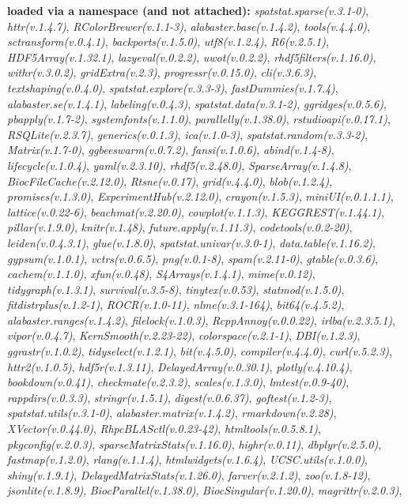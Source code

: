 \documentclass[
]{book}
\begin{document}
\textbf{loaded via a namespace (and not attached):}
\emph{spatstat.sparse(v.3.1-0)}, \emph{httr(v.1.4.7)}, \emph{RColorBrewer(v.1.1-3)}, \emph{alabaster.base(v.1.4.2)}, \emph{tools(v.4.4.0)}, \emph{sctransform(v.0.4.1)}, \emph{backports(v.1.5.0)}, \emph{utf8(v.1.2.4)}, \emph{R6(v.2.5.1)}, \emph{HDF5Array(v.1.32.1)}, \emph{lazyeval(v.0.2.2)}, \emph{uwot(v.0.2.2)}, \emph{rhdf5filters(v.1.16.0)}, \emph{withr(v.3.0.2)}, \emph{gridExtra(v.2.3)}, \emph{progressr(v.0.15.0)}, \emph{cli(v.3.6.3)}, \emph{textshaping(v.0.4.0)}, \emph{spatstat.explore(v.3.3-3)}, \emph{fastDummies(v.1.7.4)}, \emph{alabaster.se(v.1.4.1)}, \emph{labeling(v.0.4.3)}, \emph{spatstat.data(v.3.1-2)}, \emph{ggridges(v.0.5.6)}, \emph{pbapply(v.1.7-2)}, \emph{systemfonts(v.1.1.0)}, \emph{parallelly(v.1.38.0)}, \emph{rstudioapi(v.0.17.1)}, \emph{RSQLite(v.2.3.7)}, \emph{generics(v.0.1.3)}, \emph{ica(v.1.0-3)}, \emph{spatstat.random(v.3.3-2)}, \emph{Matrix(v.1.7-0)}, \emph{ggbeeswarm(v.0.7.2)}, \emph{fansi(v.1.0.6)}, \emph{abind(v.1.4-8)}, \emph{lifecycle(v.1.0.4)}, \emph{yaml(v.2.3.10)}, \emph{rhdf5(v.2.48.0)}, \emph{SparseArray(v.1.4.8)}, \emph{BiocFileCache(v.2.12.0)}, \emph{Rtsne(v.0.17)}, \emph{grid(v.4.4.0)}, \emph{blob(v.1.2.4)}, \emph{promises(v.1.3.0)}, \emph{ExperimentHub(v.2.12.0)}, \emph{crayon(v.1.5.3)}, \emph{miniUI(v.0.1.1.1)}, \emph{lattice(v.0.22-6)}, \emph{beachmat(v.2.20.0)}, \emph{cowplot(v.1.1.3)}, \emph{KEGGREST(v.1.44.1)}, \emph{pillar(v.1.9.0)}, \emph{knitr(v.1.48)}, \emph{future.apply(v.1.11.3)}, \emph{codetools(v.0.2-20)}, \emph{leiden(v.0.4.3.1)}, \emph{glue(v.1.8.0)}, \emph{spatstat.univar(v.3.0-1)}, \emph{data.table(v.1.16.2)}, \emph{gypsum(v.1.0.1)}, \emph{vctrs(v.0.6.5)}, \emph{png(v.0.1-8)}, \emph{spam(v.2.11-0)}, \emph{gtable(v.0.3.6)}, \emph{cachem(v.1.1.0)}, \emph{xfun(v.0.48)}, \emph{S4Arrays(v.1.4.1)}, \emph{mime(v.0.12)}, \emph{tidygraph(v.1.3.1)}, \emph{survival(v.3.5-8)}, \emph{tinytex(v.0.53)}, \emph{statmod(v.1.5.0)}, \emph{fitdistrplus(v.1.2-1)}, \emph{ROCR(v.1.0-11)}, \emph{nlme(v.3.1-164)}, \emph{bit64(v.4.5.2)}, \emph{alabaster.ranges(v.1.4.2)}, \emph{filelock(v.1.0.3)}, \emph{RcppAnnoy(v.0.0.22)}, \emph{irlba(v.2.3.5.1)}, \emph{vipor(v.0.4.7)}, \emph{KernSmooth(v.2.23-22)}, \emph{colorspace(v.2.1-1)}, \emph{DBI(v.1.2.3)}, \emph{ggrastr(v.1.0.2)}, \emph{tidyselect(v.1.2.1)}, \emph{bit(v.4.5.0)}, \emph{compiler(v.4.4.0)}, \emph{curl(v.5.2.3)}, \emph{httr2(v.1.0.5)}, \emph{hdf5r(v.1.3.11)}, \emph{DelayedArray(v.0.30.1)}, \emph{plotly(v.4.10.4)}, \emph{bookdown(v.0.41)}, \emph{checkmate(v.2.3.2)}, \emph{scales(v.1.3.0)}, \emph{lmtest(v.0.9-40)}, \emph{rappdirs(v.0.3.3)}, \emph{stringr(v.1.5.1)}, \emph{digest(v.0.6.37)}, \emph{goftest(v.1.2-3)}, \emph{spatstat.utils(v.3.1-0)}, \emph{alabaster.matrix(v.1.4.2)}, \emph{rmarkdown(v.2.28)}, \emph{XVector(v.0.44.0)}, \emph{RhpcBLASctl(v.0.23-42)}, \emph{htmltools(v.0.5.8.1)}, \emph{pkgconfig(v.2.0.3)}, \emph{sparseMatrixStats(v.1.16.0)}, \emph{highr(v.0.11)}, \emph{dbplyr(v.2.5.0)}, \emph{fastmap(v.1.2.0)}, \emph{rlang(v.1.1.4)}, \emph{htmlwidgets(v.1.6.4)}, \emph{UCSC.utils(v.1.0.0)}, \emph{shiny(v.1.9.1)}, \emph{DelayedMatrixStats(v.1.26.0)}, \emph{farver(v.2.1.2)}, \emph{zoo(v.1.8-12)}, \emph{jsonlite(v.1.8.9)}, \emph{BiocParallel(v.1.38.0)}, \emph{BiocSingular(v.1.20.0)}, \emph{magrittr(v.2.0.3)}, 
\end{document}
